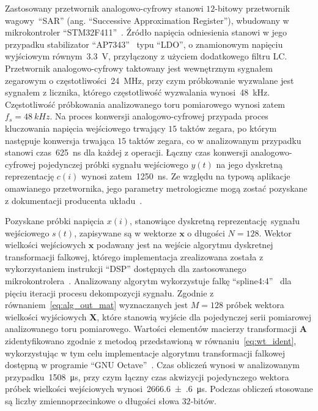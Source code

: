 Zastosowany przetwornik analogowo-cyfrowy stanowi $12$-bitowy przetwornik wagowy~\enquote{SAR} (ang. \enquote{Successive Approximation Register}), wbudowany w mikrokontroler \enquote{STM32F411}~\cite{stm_f411}. Źródło napięcia odniesienia stanowi w jego przypadku stabilizator \enquote{AP7343}~\cite{diodes_manual} typu \enquote{LDO}, o znamionowym napięciu wyjściowym równym~\qty{3.3}{V}, przyłączony z użyciem dodatkowego filtru LC. Przetwornik analogowo-cyfrowy taktowany jest wewnętrznym sygnałem zegarowym o częstotliwości~\qty{24}{MHz}, przy czym próbkowanie wyzwalane jest sygnałem z licznika, którego częstotliwość wyzwalania wynosi~\qty{48}{kHz}. Częstotliwość próbkowania analizowanego toru pomiarowego wynosi zatem $f_{s} = \qty{48}{kHz}$. Na proces konwersji analogowo-cyfrowej przypada proces kluczowania napięcia wejściowego trwający $15$ taktów zegara, po którym następuje konwersja trwająca $15$ taktów zegara, co w analizowanym przypadku stanowi czas~\qty{625}{ns} dla każdej z operacji. Łączny czas konwersji analogowo-cyfrowej pojedynczej próbki sygnału wejściowego $y(t)$ na jego dyskretną reprezentację $c(i)$ wynosi zatem~\qty{1250}{ns}. Ze względu na typową aplikacje omawianego przetwornika, jego parametry metrologiczne mogą zostać pozyskane z dokumentacji producenta układu~\cite{stm_f411}.

Pozyskane próbki napięcia $x(i)$, stanowiące dyskretną reprezentację sygnału wejściowego $s(t)$, zapisywane są w wektorze $\mathbf{x}$ o długości $N = 128$. Wektor wielkości wejściowych $\mathbf{x}$ podawany jest na wejście algorytmu dyskretnej transformacji falkowej, którego implementacja zrealizowana została z wykorzystaniem instrukcji \enquote{DSP} dostępnych dla zastosowanego mikrokontrolera~\cite{reay_dsp}. Analizowany algorytm wykorzystuje falkę \enquote{spline4:4}~\cite{wang_splinebasics} dla pięciu iteracji procesu dekompozycji sygnału. Zgodnie z równaniem~\eqref{eq:alg_out_mat} wyznaczanych jest $M = 128$ próbek wektora wielkości wyjściowych $\mathbf{X}$, które stanowią wyjście dla pojedynczej serii pomiarowej analizowanego toru pomiarowego. Wartości elementów macierzy transformacji $\mathbf{A}$ zidentyfikowano zgodnie z metodoą przedstawioną w równaniu~\eqref{eq:wt_ident}, wykorzystując w tym celu implementacje algorytmu transformacji falkowej dostępną w programie \enquote{GNU Octave}~\cite{pruuvsa_dwt}. Czas obliczeń wynosi w analizowanym przypadku~\qty{1508}{\micro s}, przy czym łączny czas akwizycji pojedynczego wektora próbek wielkości wejściowych wynosi~\qty{2666.6(6)}{\micro s}. Podczas obliczeń stosowane są liczby zmiennoprzecinkowe o długości słowa $32$-bitów.

